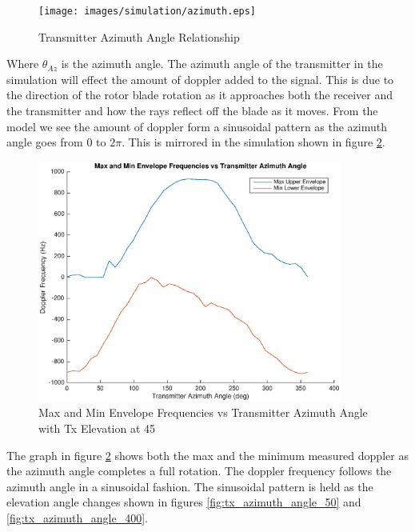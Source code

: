 \begin{figure}
	\begin{center}
		\texttt{[image: images/simulation/azimuth.eps]}
		\caption{Transmitter Azimuth Angle Relationship}
		\label{fig:tx_azimuth_rel}
	\end{center}
\end{figure}

Where $\theta_{Az}$ is the azimuth angle. The azimuth angle of the transmitter in the simulation will effect the amount of doppler added to the signal. This is due to the direction of the rotor blade rotation as it approaches both the receiver and the transmitter and how the rays reflect off the blade as it moves. From the model we see the amount of doppler form a sinusoidal pattern as the azimuth angle goes from $0$ to $2\pi$. This is mirrored in the simulation shown in figure \ref{fig:tx_azimuth_angle_200}.

\begin{figure}
	\begin{center}
		\includegraphics[width=10cm]{images/simulation/Azimuth_angle_200_max_doppler.eps}
		\caption{Max and Min Envelope Frequencies vs Transmitter Azimuth Angle with Tx Elevation at 45\textdegree}
		\label{fig:tx_azimuth_angle_200}
	\end{center}
\end{figure}

The graph in figure \ref{fig:tx_azimuth_angle_200} shows both the max and the minimum measured doppler as the azimuth angle completes a full rotation. The doppler frequency follows the azimuth angle in a sinusoidal fashion. The sinusoidal pattern is held as the elevation angle changes shown in figures \ref{fig:tx_azimuth_angle_50} and \ref{fig:tx_azimuth_angle_400}.

